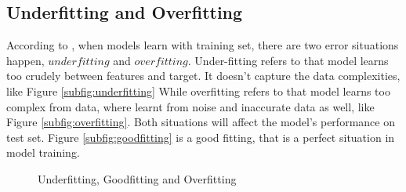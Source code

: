 \documentclass[12pt,a4paper,english
]{tunithesis}
\begin{document}
\subsection{Underfitting and Overfitting}
According to \textcite{stanford_ml}, when models learn with training set, there are two error situations happen, $underfitting$ and $overfitting$. Under-fitting refers to that model learns too crudely between features and target. It doesn't capture the data complexities, like Figure \ref{subfig:underfitting} While overfitting refers to that model learns too complex from data, where learnt from noise and inaccurate data as well, like Figure \ref{subfig:overfitting}. Both situations will affect the model's performance on test set. Figure \ref{subfig:goodfitting} is a good fitting, that is a perfect situation in model training.
\begin{figure}
  \begin{center}
    \caption[Under, Good and Overfitting]{Underfitting, Goodfitting and Overfitting}
    \label{fig:different_fitting}
  \end{center}
\end{figure}
\end{document}
